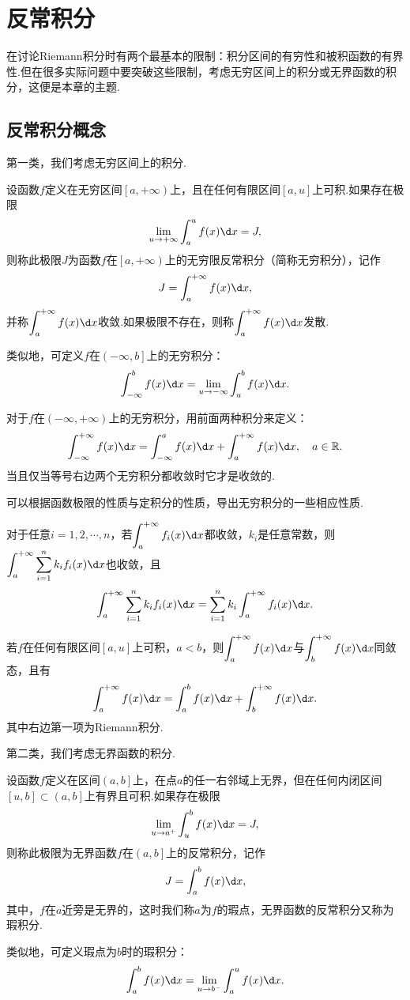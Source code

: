\chapter{反常积分}
在讨论Riemann积分时有两个最基本的限制：积分区间的有穷性和被积函数的有界性.但在很多实际问题中要突破这些限制，考虑无穷区间上的积分或无界函数的积分，这便是本章的主题.
\section{反常积分概念}
第一类，我们考虑无穷区间上的积分.
\begin{definition}[无穷积分]
	设函数$f$定义在无穷区间$\left[a,+\infty\right)$上，且在任何有限区间$\left[a,u\right]$上可积.如果存在极限
	$$\lim\limits_{u\to +\infty}\int_{a}^{u}f(x)\d x=J,$$
	则称此极限$J$为函数$f$在$\left[a,+\infty\right)$上的{\heiti 无穷限反常积分}（简称{\heiti 无穷积分}），记作
	$$J=\int_{a}^{+\infty}f(x)\d x,$$
	并称$\displaystyle\int_{a}^{+\infty}f(x)\d x${\heiti 收敛}.如果极限不存在，则称$\displaystyle\int_{a}^{+\infty}f(x)\d x${\heiti 发散}.
\end{definition}
类似地，可定义$f$在$\left(-\infty,b\right]$上的无穷积分：
$$\int_{-\infty}^{b}f(x)\d x=\lim\limits_{u\to -\infty}\int_{u}^{b}f(x)\d x.$$

对于$f$在$(-\infty,+\infty)$上的无穷积分，用前面两种积分来定义：
$$\int_{-\infty}^{+\infty}f(x)\d x=\int_{-\infty}^{a}f(x)\d x+\int_{a}^{+\infty}f(x)\d x,\quad a\in\mathbb{R}.$$
当且仅当等号右边两个无穷积分都收敛时它才是收敛的.

可以根据函数极限的性质与定积分的性质，导出无穷积分的一些相应性质.
\begin{proposition}
	对于任意$i=1,2,\cdots,n$，若$\displaystyle\int_{a}^{+\infty}f_i(x)\d x$都收敛，$k_i$是任意常数，则$\displaystyle\int_{a}^{+\infty}\displaystyle\sum_{i=1}^{n}k_if_i(x)\d x$也收敛，且
	$$\int_{a}^{+\infty}\sum_{i=1}^{n}k_if_i(x)\d x=\sum_{i=1}^{n}k_i\int_{a}^{+\infty}f_i(x)\d x.$$
\end{proposition}
\begin{proposition}
	若$f$在任何有限区间$\left[a,u\right]$上可积，$a<b$，则$\displaystyle\int_{a}^{+\infty}f(x)\d x$与$\displaystyle\int_{b}^{+\infty}f(x)\d x$同敛态，且有
	$$\int_{a}^{+\infty}f(x)\d x=\int_{a}^{b}f(x)\d x+\int_{b}^{+\infty}f(x)\d x.$$
	其中右边第一项为Riemann积分.
\end{proposition}
第二类，我们考虑无界函数的积分.
\begin{definition}[瑕积分]
	设函数$f$定义在区间$\left(a,b\right]$上，在点$a$的任一右邻域上无界，但在任何内闭区间$\left[u,b\right]\subset\left(a,b\right]$上有界且可积.如果存在极限
	$$\lim\limits_{u\to a^+}\int_{u}^{b}f(x)\d x=J,$$
	则称此极限为无界函数$f$在$\left(a,b\right]$上的反常积分，记作
	$$J=\int_{a}^{b}f(x)\d x,$$
	其中，$f$在$a$近旁是无界的，这时我们称$a$为$f$的{\heiti 瑕点}，无界函数的反常积分又称为{\heiti 瑕积分}.
\end{definition}
类似地，可定义瑕点为$b$时的瑕积分：
$$\int_{a}^{b}f(x)\d x=\lim\limits_{u\to b^-}\int_{a}^{u}f(x)\d x.$$

